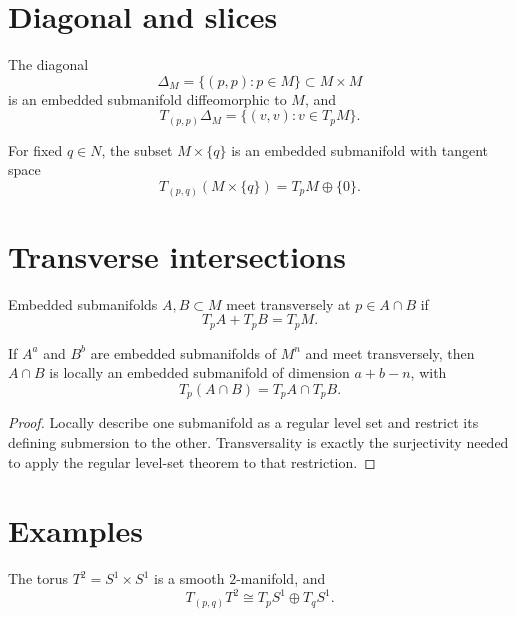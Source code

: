 \section{Diagonal and slices}
\begin{proposition}[Diagonal]\label{prop:vii06-diagonal}
The diagonal
\[
\Delta_M=\{(p,p):p\in M\}\subset M\times M
\]
is an embedded submanifold diffeomorphic to \(M\), and
\[
T_{(p,p)}\Delta_M=\{(v,v):v\in T_pM\}.
\]
\end{proposition}

\begin{proposition}\label{prop:vii06-slices}
For fixed \(q\in N\), the subset \(M\times\{q\}\) is an embedded submanifold with tangent space
\[
T_{(p,q)}(M\times\{q\})=T_pM\oplus\{0\}.
\]
\end{proposition}

\section{Transverse intersections}
\begin{definition}\label{def:vii06-transverse}
Embedded submanifolds \(A,B\subset M\) meet transversely at \(p\in A\cap B\) if
\[
T_pA+T_pB=T_pM.
\]
\end{definition}

\begin{theorem}\label{thm:vii06-transverse-intersection}
If \(A^a\) and \(B^b\) are embedded submanifolds of \(M^n\) and meet transversely, then \(A\cap B\) is locally an embedded submanifold of dimension \(a+b-n\), with
\[
T_p(A\cap B)=T_pA\cap T_pB.
\]
\end{theorem}
\begin{proof}
Locally describe one submanifold as a regular level set and restrict its defining submersion to the other. Transversality is exactly the surjectivity needed to apply the regular level-set theorem to that restriction.
\end{proof}

\section{Examples}
\begin{example}\label{ex:vii06-torus}
The torus \(T^2=S^1\times S^1\) is a smooth \(2\)-manifold, and
\[
T_{(p,q)}T^2\cong T_pS^1\oplus T_qS^1.
\]
\end{example}

